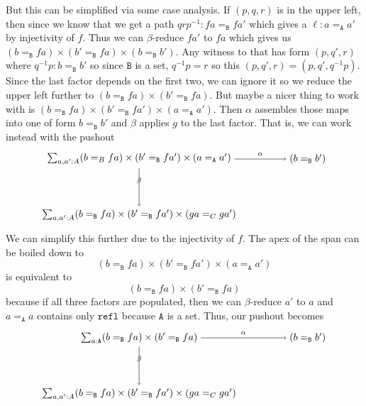 \documentclass[12pt]{amsart}
\newcommand{\type}[1]{\mathtt{#1}}
\newcommand{\A}{\type{A}}
\newcommand{\B}{\type{B}}
\newcommand{\refl}{\type{refl}}
\theoremstyle{remark}
\theoremstyle{definition}
\begin{document}
But this can be simplified via some case analysis. If $ (p,q,r) $ is
in the upper left, then since we know that we get a path
$ q r p^{-1} : fa =_{\B} fa' $ which gives a $ \ell : a =_{\A} a' $ by
injectivity of $ f $.  Thus we can $ \beta $-reduce $ fa' $ to $ fa $
which gives us
$ (b=_{\B} fa) \times (b'=_{\B} fa) \times (b=_{\B} b') $.  Any
witness to that has form $ (p,q',r) $ where $ q^{-1}p : b =_{\B} b' $
so since $ \B $ is a set, $ q^{-1}p = r $ so this
$ (p,q',r) = (p,q',q^{-1}p) $.  Since the last factor depends on the
first two, we can ignore it so we reduce the upper left further to
$ (b=_{\B} fa) \times (b'=_{\B} fa) $.  But maybe a nicer thing to
work with is
$ (b=_{\B} fa) \times (b'=_{\B} fa') \times (a =_{\A} a') $.  Then
$ \alpha $ assembles those maps into one of form $ b =_{\B} b' $ and
$ \beta $ applies $ g $ to the last factor. That is, we can work
instead with the pushout
\[
\begin{tikzpicture}
	\node (1) at (0,2) 
	{ $ \sum_{ a , a' : A } 
		( b =_B f  a ) 
		\times ( b' =_{\B} f  a' ) 
		\times ( a =_{\A} a' ) $ };
	\node (2) at (6,2) 
	{ $ ( b =_{\B} b' ) $ };
	\node (3) at (0,0) 
	{ $ \sum_{ a , a' : A } 
		( b =_{\B} f a ) 
		\times  (b' =_{\B} f a' ) 
		\times ( g a =_C g a' ) $ };
	\draw [ -> ] (1) to 
	node [above] {\scriptsize $ \alpha $} 
	(2);
	\draw [ -> ] (1) to 
	node [above] {\scriptsize $ \beta $}
	(3);
\end{tikzpicture}
\]
We can simplify this further due to the injectivity of $ f $.  The apex of the span can be boiled down to  
\[
	( b =_{\B} fa ) \times ( b' =_{\B} fa' ) \times ( a =_{\A} a' )  
\] 
is equivalent to 
\[
	( b =_{\B} fa ) \times ( b' =_{\B} fa ) 
\]
because if all three factors are populated, then we can $ \beta $-reduce $ a' $ to $ a $ and $ a =_{\A} a $ contains only $ \refl $ because $ \A $ is a set.  Thus, our pushout becomes
\[
\begin{tikzpicture}
	\node (1) at (0,2) 
		{ $ \sum_{ a : \A } 
		( b =_\B f  a ) 
		\times ( b' =_{\B} f  a ) $} ; 
	\node (2) at (6,2) 
		{ $ ( b =_{\B} b' ) $ };
	\node (3) at (0,0) 
		{ $ \sum_{ a , a' : A } 
		( b =_{\B} f a ) 
		\times  (b' =_{\B} f a' ) 
		\times ( g a =_C g a' ) $ };
	\draw [ -> ] (1) to 
		node [above] {\scriptsize $ \alpha $} 
		(2);
	\draw [ -> ] (1) to 
		node [above] {\scriptsize $ \beta $}
		(3);
\end{tikzpicture}
\]
\end{document}
